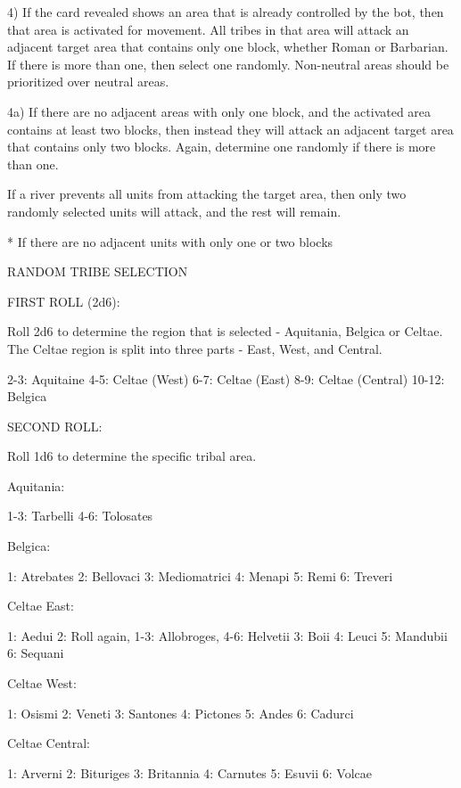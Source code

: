 4) If the card revealed shows an area that is already controlled by the bot, then that area is activated for movement. All tribes in that area will attack an adjacent target area that contains only one block, whether Roman or Barbarian. If there is more than one, then select one randomly. Non-neutral areas should be prioritized over neutral areas.

4a) If there are no adjacent areas with only one block, and the activated area contains at least two blocks, then instead they will attack an adjacent target area that contains only two blocks. Again, determine one randomly if there is more than one.

If a river prevents all units from attacking the target area, then only two randomly selected units will attack, and the rest will remain.

* If there are no adjacent units with only one or two blocks

RANDOM TRIBE SELECTION

FIRST ROLL (2d6):

Roll 2d6 to determine the region that is selected - Aquitania, Belgica or Celtae. The Celtae region is split into three parts - East, West, and Central.

2-3: Aquitaine
4-5: Celtae (West)
6-7: Celtae (East)
8-9: Celtae (Central)
10-12: Belgica

SECOND ROLL:

Roll 1d6 to determine the specific tribal area.

Aquitania:

1-3: Tarbelli
4-6: Tolosates

Belgica:

1: Atrebates
2: Bellovaci
3: Mediomatrici
4: Menapi
5: Remi
6: Treveri

Celtae East:

1: Aedui
2: Roll again, 1-3: Allobroges, 4-6: Helvetii
3: Boii
4: Leuci
5: Mandubii
6: Sequani

Celtae West:

1: Osismi
2: Veneti
3: Santones
4: Pictones
5: Andes
6: Cadurci

Celtae Central:

1: Arverni
2: Bituriges
3: Britannia
4: Carnutes
5: Esuvii
6: Volcae

